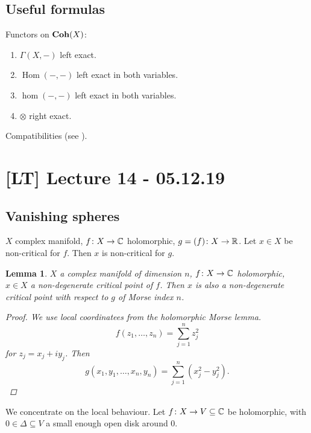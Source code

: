 \documentclass[A4paper, british, reqno]{amsart}
\theoremstyle{darkgreentheorem}
\newtheorem{lm}[thm]{Lemma}
\theoremstyle{darkbluedefinition}
\theoremstyle{darkredexample}
\theoremstyle{remark}
\DeclareMathOperator{\Hom}{Hom}
\let\Re\relax
\DeclareMathOperator{\Re}{Re}
\newcommand{\1}{\mathbbm{1}}
\newcommand{\ot}{\otimes}
\newcommand{\sub}{\subseteq}
\begin{document}
\subsection{Useful formulas}

Functors on $\mathbf{Coh}(X)$:
\begin{enumerate}
    \item $\Gamma(X,-)$ left exact.
    \item $\Hom(-,-)$ left exact in both variables.
    \item $\hom(-,-)$ left exact in both variables.
    \item $\ot $ right exact.
\end{enumerate}

Compatibilities (see \cite[Chapter 3]{huy06}).

\section{[LT] Lecture 14 - 05.12.19}

\subsection{Vanishing spheres}

$X$ complex manifold, $f\colon X\to \mathbb{C}$ holomorphic, $g=\Re(f)\colon X\to \R$.
Let $x\in X$ be non-critical for $f$.
Then $x$ is non-critical for $g$.

\begin{lm}
    $X$ a complex manifold of dimension $n$, $f\colon X\to \mathbb{C}$ holomorphic, $x\in X$ a non-degenerate critical point of $f$.
    Then $x$ is also a non-degenerate critical point with respect to $g$ of Morse index $n$.
    \begin{proof}
	We use local coordinatees from the holomorphic Morse lemma.
	\[ f(z_{1},\ldots,z_{n})=\sum_{j=1}^{n}z_{j}^{2} \]
	for $z_{j}=x_{j}+iy_{j}$.
	Then
	\[ g(x_{1},y_{1},\ldots,x_{n},y_{n})=\sum_{j=1}^{n}(x_{j}^{2}-y_{j}^{2}).\]
    \end{proof}
\end{lm}

We concentrate on the local behaviour.
Let $f\colon X\to V\sub \C$ be holomorphic, with $0\in \Delta\sub V$ a small enough open disk around $0$.
\end{document}
